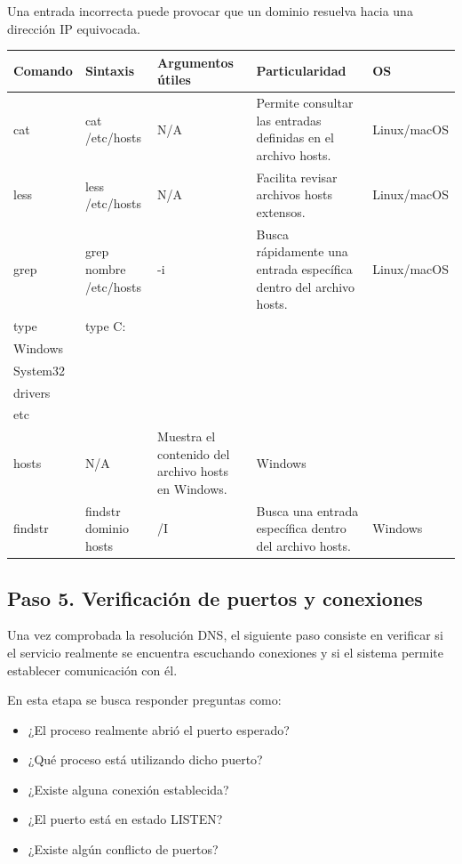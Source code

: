 \documentclass[a4paper,10pt]{article}
\begin{document}
Una entrada incorrecta puede provocar que un dominio resuelva hacia una
dirección IP equivocada.

\begin{longtable}{|p{2.8cm}|p{3cm}|p{4cm}|p{5.6cm}|p{1.5cm}|}

\hline
Comando &
Sintaxis &
Argumentos útiles &
Particularidad &
OS
\\
\hline
\endhead

cat &
cat /etc/hosts &
N/A &
Permite consultar las entradas definidas en el archivo hosts. &
Linux/macOS
\\
\hline

less &
less /etc/hosts &
N/A &
Facilita revisar archivos hosts extensos. &
Linux/macOS
\\
\hline

grep &
grep nombre /etc/hosts &
-i &
Busca rápidamente una entrada específica dentro del archivo hosts. &
Linux/macOS
\\
\hline

type &
type C:\\Windows\\System32\\drivers\\etc\\hosts &
N/A &
Muestra el contenido del archivo hosts en Windows. &
Windows
\\
\hline

findstr &
findstr dominio hosts &
/I &
Busca una entrada específica dentro del archivo hosts. &
Windows
\\
\hline

\end{longtable}




\subsection{Paso 5. Verificación de puertos y conexiones}

Una vez comprobada la resolución DNS, el siguiente paso consiste en verificar
si el servicio realmente se encuentra escuchando conexiones y si el sistema
permite establecer comunicación con él.

En esta etapa se busca responder preguntas como:

\begin{itemize}
\item ¿El proceso realmente abrió el puerto esperado?
\item ¿Qué proceso está utilizando dicho puerto?
\item ¿Existe alguna conexión establecida?
\item ¿El puerto está en estado LISTEN?
\item ¿Existe algún conflicto de puertos?
\end{itemize}
\end{document}
